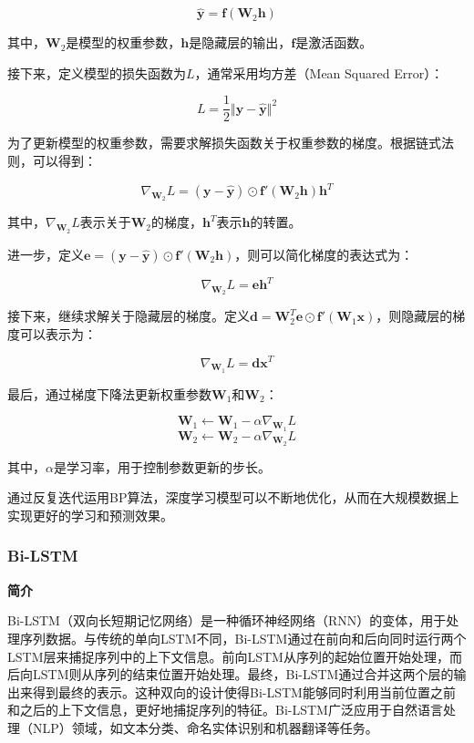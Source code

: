 \documentclass[hyperref,a4paper,UTF8]{ctexart}
\begin{document}
$$\hat{\mathbf{y}} = \mathbf{f}(\mathbf{W}_2 \mathbf{h})$$

其中，$\mathbf{W}_2$是模型的权重参数，$\mathbf{h}$是隐藏层的输出，$\mathbf{f}$是激活函数。

接下来，定义模型的损失函数为$L$，通常采用均方差（Mean Squared Error）：

$$L = \frac{1}{2} \Vert \mathbf{y} - \hat{\mathbf{y}} \Vert^2$$

为了更新模型的权重参数，需要求解损失函数关于权重参数的梯度。根据链式法则，可以得到：

$$\nabla_{\mathbf{W}_2} L = (\mathbf{y} - \hat{\mathbf{y}}) \odot \mathbf{f}'(\mathbf{W}_2 \mathbf{h}) \mathbf{h}^T$$

其中，$\nabla_{\mathbf{W}_2} L$表示关于$\mathbf{W}_2$的梯度，$\mathbf{h}^T$表示$\mathbf{h}$的转置。

进一步，定义$\mathbf{e} = (\mathbf{y} - \hat{\mathbf{y}}) \odot \mathbf{f}'(\mathbf{W}_2 \mathbf{h})$，则可以简化梯度的表达式为：

$$\nabla_{\mathbf{W}_2} L = \mathbf{e} \mathbf{h}^T$$

接下来，继续求解关于隐藏层的梯度。定义$\mathbf{d} = \mathbf{W}_2^T \mathbf{e} \odot \mathbf{f}'(\mathbf{W}_1 \mathbf{x})$，则隐藏层的梯度可以表示为：

$$\nabla_{\mathbf{W}_1} L = \mathbf{d} \mathbf{x}^T$$

最后，通过梯度下降法更新权重参数$\mathbf{W}_1$和$\mathbf{W}_2$：

$$\mathbf{W}_1 \leftarrow \mathbf{W}_1 - \alpha \nabla_{\mathbf{W}_1} L$$
$$\mathbf{W}_2 \leftarrow \mathbf{W}_2 - \alpha \nabla_{\mathbf{W}_2} L$$

其中，$\alpha$是学习率，用于控制参数更新的步长。


通过反复迭代运用BP算法，深度学习模型可以不断地优化，从而在大规模数据上实现更好的学习和预测效果。

\subsubsection{Bi-LSTM}
\textbf{简介}


Bi-LSTM（双向长短期记忆网络）是一种循环神经网络（RNN）的变体，用于处理序列数据。与传统的单向LSTM不同，Bi-LSTM通过在前向和后向同时运行两个LSTM层来捕捉序列中的上下文信息。前向LSTM从序列的起始位置开始处理，而后向LSTM则从序列的结束位置开始处理。最终，Bi-LSTM通过合并这两个层的输出来得到最终的表示。这种双向的设计使得Bi-LSTM能够同时利用当前位置之前和之后的上下文信息，更好地捕捉序列的特征。Bi-LSTM广泛应用于自然语言处理（NLP）领域，如文本分类、命名实体识别和机器翻译等任务。\cite{DBLP:journals/access/WangWZ23}
\end{document}
